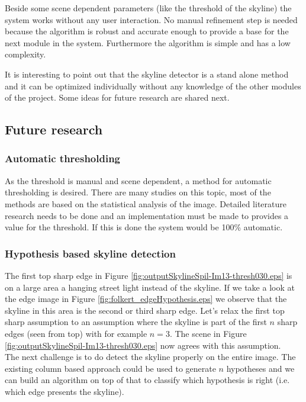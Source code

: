 Beside some scene dependent parameters (like the threshold of the skyline) the
system works without any user interaction. No manual refinement step is needed
because the algorithm is robust and accurate enough to provide a base for the
next module in the system. Furthermore the algorithm is simple and has a low
complexity. 

It is interesting to point out that the skyline detector is a stand alone method
and it can be optimized individually without any knowledge of the other modules
of the project.  Some ideas for future research are shared next.

\subsection{Future research}
\label{sec:skylinefut}
\subsubsection{Automatic thresholding}
As the threshold is manual and scene dependent, a method for automatic
thresholding is desired. There are many studies on this topic, most of the
methods are based on the statistical analysis of the image. Detailed literature
research needs to be done and an implementation must be made to provides a value
for the threshold. If this is done the system would be 100\% automatic.

\subsubsection{Hypothesis based skyline detection}

The first top sharp edge in Figure \ref{fig:outputSkylineSpil-Im13-thresh030.eps}
is on a large area a hanging street light instead of the skyline.
If we take a look at the edge image in Figure
\ref{fig:folkert_edgeHypothesis.eps} we observe that the skyline in this area is the second or third
sharp edge.
Let's relax the first top sharp assumption to an assumption where the skyline is
part of the first $n$ sharp edges (seen from top) with for example $n=3$.
The scene in Figure \ref{fig:outputSkylineSpil-Im13-thresh030.eps} now agrees with
this assumption.\\
The next challenge is to do detect the skyline properly on the entire image.
The existing column based approach could be used to generate $n$ hypotheses and we can build
an algorithm on top of that to classify which hypothesis is right (i.e. which edge
presents the skyline).

